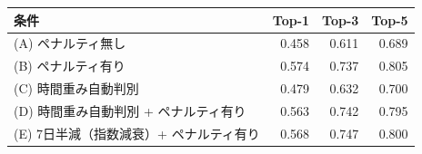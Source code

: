 \begin{tabular}{l r r r}
\hline
条件 & Top-1 & Top-3 & Top-5 \\
\hline
(A) ペナルティ無し & 0.458 & 0.611 & 0.689 \\
(B) ペナルティ有り & 0.574 & 0.737 & 0.805 \\
(C) 時間重み自動判別 & 0.479 & 0.632 & 0.700 \\
(D) 時間重み自動判別 + ペナルティ有り & 0.563 & 0.742 & 0.795 \\
(E) 7日半減（指数減衰）+ ペナルティ有り & 0.568 & 0.747 & 0.800 \\
\hline
\end{tabular}

